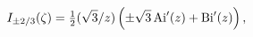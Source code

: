 \[\mathop{I_{\pm 2/3}\/}\nolimits\!\left(\zeta\right)=\tfrac{1}{2}(\sqrt{3}/z)%
\left(\pm\sqrt{3}\mathop{\mathrm{Ai}\/}\nolimits'\!\left(z\right)+\mathop{%
\mathrm{Bi}\/}\nolimits'\!\left(z\right)\right),\]